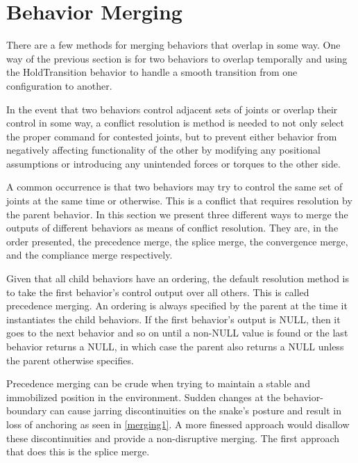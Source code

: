 \section{Behavior Merging}
\label{sec:merge}

There are a few methods for merging behaviors that overlap in some way. One way of the previous section is for two behaviors to overlap temporally and using the HoldTransition behavior to handle a smooth transition from one configuration to another.

In the event that two behaviors control adjacent sets of joints or overlap their control in some way, a conflict resolution is method is needed to not only select the proper command for contested joints, but to prevent either behavior from negatively affecting functionality of the other by modifying any positional assumptions or introducing any unintended forces or torques to the other side.

A common occurrence is that two behaviors may try to control the same set of joints at the same time or otherwise. This is a conflict that requires resolution by the parent behavior. In this section we present three different ways to merge the outputs of different behaviors as means of conflict resolution. They are, in the order presented, the precedence merge, the splice merge, the convergence merge, and the compliance merge respectively.

Given that all child behaviors have an ordering, the default resolution method is to take the first behavior's control output over all others. This is called precedence merging. An ordering is always specified by the parent at the time it instantiates the child behaviors. If the first behavior's output is NULL, then it goes to the next behavior and so on until a non-NULL value is found or the last behavior returns a NULL, in which case the parent also returns a NULL unless the parent otherwise specifies.

Precedence merging can be crude when trying to maintain a stable and immobilized position in the environment. Sudden changes at the behavior-boundary can cause jarring discontinuities on the snake's posture and result in loss of anchoring as seen in \autoref{merging1}. A more finessed approach would disallow these discontinuities and provide a non-disruptive merging. The first approach that does this is the splice merge.

